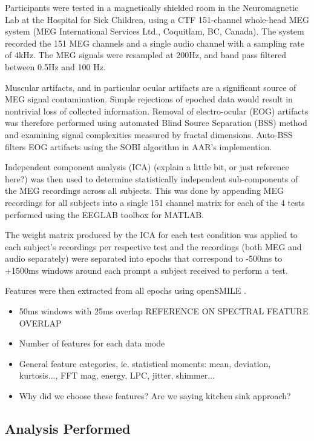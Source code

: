 \documentclass[a4paper]{article}
\begin{document}
Participants were tested in a magnetically shielded room in the Neuromagnetic Lab at the Hospital for Sick Children, using a CTF 151-channel whole-head MEG system (MEG International Services Ltd., Coquitlam, BC, Canada). The system recorded the 151 MEG channels and a single audio channel with a sampling rate of 4kHz. The MEG signals were resampled at 200Hz, and band pass filtered between 0.5Hz and 100 Hz.

Muscular artifacts, and in particular ocular artifacts are a significant source of MEG signal contamination. Simple rejections of epoched data would result in nontrivial loss of collected information. Removal of electro-ocular (EOG) artifacts was therefore performed using automated Blind Source Separation (BSS) method and examining signal complexities measured by fractal dimensions. Auto-BSS filters EOG artifacts using the SOBI algorithm in AAR's implemention.

Independent component analysis (ICA) (explain a little bit, or just reference here?) was then used to determine statistically independent sub-components of the MEG recordings across all subjects. This was done by appending MEG recordings for all subjects into a single 151 channel matrix for each of the 4 tests performed using the EEGLAB toolbox \cite{Delorme04eeglab} for MATLAB.

The weight matrix produced by the ICA for each test condition was applied to each subject's recordings per respective test and the recordings (both MEG and audio separately) were separated into epochs that correspond to -500ms to +1500ms windows around each prompt a subject received to perform a test.

Features were then extracted from all epochs using openSMILE \cite{Eyben13-RDI}. 

\begin{itemize}
\item 50ms windows with 25ms overlap REFERENCE ON SPECTRAL FEATURE OVERLAP
\item Number of features for each data mode
\item General feature categories, ie. statistical moments: mean, deviation, kurtosis..., FFT mag, energy,
  LPC, jitter, shimmer...
\item Why did we choose these features? Are we saying kitchen sink approach?
\end{itemize}

\subsection{Analysis Performed}
\end{document}
